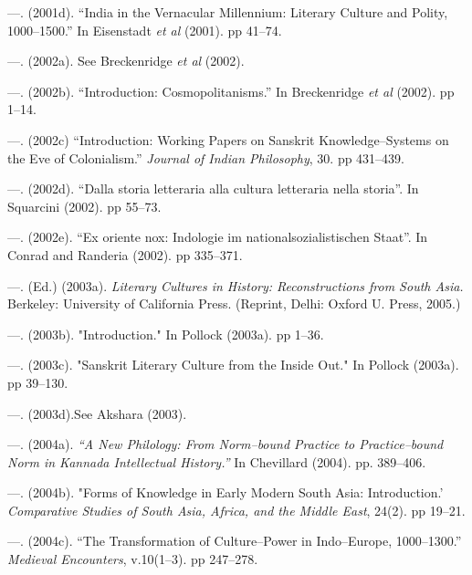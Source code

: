  \item —. (2001d). “India in the Vernacular Millennium: Literary Culture and Polity, 1000–1500.” In Eisenstadt \textit{et al} (2001). pp 41–74.

 \item —. (2002a). See Breckenridge \textit{et al} (2002).

 \item —. (2002b). “Introduction: Cosmopolitanisms.” In Breckenridge \textit{et al} (2002). pp 1–14.

 \item —. (2002c) “Introduction: Working Papers on Sanskrit Knowledge–Systems on the Eve of Colonialism.” \textit{Journal of Indian Philosophy}, 30. pp 431–439.

 \item —. (2002d). “Dalla storia letteraria alla cultura letteraria nella storia”. In Squarcini (2002). pp 55–73.

 \item —. (2002e). “Ex oriente nox: Indologie im nationalsozialistischen Staat”. In Conrad and Randeria (2002). pp 335–371.

 \item —. (Ed.) (2003a). \textit{Literary Cultures in History: Reconstructions from South Asia. }Berkeley: University of California Press. (Reprint, Delhi: Oxford U. Press, 2005.)

 \item —. (2003b). "Introduction." In Pollock (2003a). pp 1–36.

 \item —. (2003c). "Sanskrit Literary Culture from the Inside Out." In Pollock (2003a). pp 39–130.

 \item —. (2003d).See Akshara (2003).

 \item —. (2004a).\textit{ “A New Philology: From Norm–bound Practice to Practice–bound Norm in Kannada Intellectual History.” }In Chevillard (2004). pp. 389–406.

 \item —. (2004b). "Forms of Knowledge in Early Modern South Asia: Introduction.’ \textit{Comparative Studies of South Asia, Africa, and the Middle East}, 24(2). pp 19–21.

 \item —. (2004c). “The Transformation of Culture–Power in Indo–Europe, 1000–1300.” \textit{Medieval Encounters}, v.10(1–3). pp 247–278.

